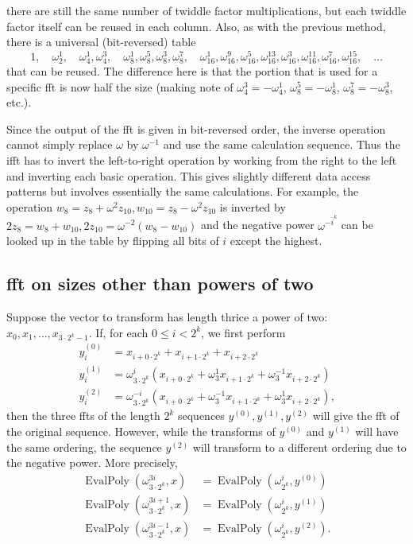 \documentclass[12 pt]{amsart}
\newcommand{\om}[2] {\omega_{#1}^{#2}}
\begin{document}
there are still the same number of twiddle factor multiplications, but each twiddle factor
itself can be reused in each column. Also, as with the previous method, there is a
universal (bit-reversed) table
\begin{equation}
\label{fft_fma_tab}
1,
\quad \om{2}{1},
\quad \om{4}{1}, \om{4}{3},
\quad \om{8}{1},\om{8}{5},\om{8}{3},\om{8}{7},
\quad \om{16}{1},\om{16}{9},\om{16}{5},\om{16}{13},\om{16}{3},\om{16}{11},\om{16}{7},\om{16}{15},
\quad \dots
\end{equation}
that can be reused. The difference here is that the portion that is used for a
specific fft is now half the size (making note of $\om{4}{3} = -\om{4}{1}$,
$\om{8}{5} = -\om{8}{1}$, $\om{8}{7} = -\om{8}{3}$, etc.).

Since the output of the fft is given in bit-reversed order, the inverse
operation cannot simply replace $\omega$ by $\omega^{-1}$ and use the same
calculation sequence. Thus the ifft has to invert the left-to-right operation
by working from the right to the left and inverting each basic operation. This
gives slightly different data access patterns but involves essentially the same
calculations. For example, the operation $w_8 = z_8 + \omega^2 z_{10}\text{,}
\, w_{10} = z_8 - \omega^2 z_{10}$ is inverted by $2 z_8 = w_8 + w_{10}\text{,}
\, 2 z_{10} = \omega^{-2}(w_8 - w_{10})$ and the negative power
$\omega^{-\overline{i}^k}$ can be looked up in the table by flipping all bits
of $i$ except the highest.

\subsection{fft on sizes other than powers of two}
\label{section_odd}

Suppose the vector to transform has length thrice a power of two: 
$x_0,x_1,\dots,x_{3\cdot2^k-1}$. If, for each $0 \le i < 2^k$, we first perform
\begin{align*}
y_{i}^{(0)} &= x_{i+0\cdot 2^k} + x_{i+1\cdot 2^k} + x_{i+2\cdot 2^k}\\
y_{i}^{(1)} &= \om{3\cdot 2^k}{i}(x_{i+0\cdot 2^k} + \om{3}{1}x_{i+1\cdot 
2^k} + \om{3}{-1}x_{i+2\cdot 2^k})\\
y_{i}^{(2)} &= \om{3\cdot 2^k}{-i}(x_{i+0\cdot 2^k} + 
\om{3}{-1}x_{i+1\cdot 
2^k} + \om{3}{1}x_{i+2\cdot 2^k})\text{,}
\end{align*}
then the three ffts of the length $2^k$ sequences $y^{(0)}, y^{(1)}, y^{(2)}$ 
will give the fft of the original sequence. However, while the transforms
of $y^{(0)}$ and $y^{(1)}$ will have the same ordering, the sequence $y^{(2)}$
will transform to a different ordering due to the negative power.
More precisely,
\begin{align*}
\operatorname{EvalPoly}(\om{3\cdot2^k}{3i}, x) &= 
\operatorname{EvalPoly}(\om{2^k}{i}, y^{(0)})\\
\operatorname{EvalPoly}(\om{3\cdot2^k}{3i+1}, x) &= 
\operatorname{EvalPoly}(\om{2^k}{i}, y^{(1)})\\
\operatorname{EvalPoly}(\om{3\cdot2^k}{3i-1}, x) &= 
\operatorname{EvalPoly}(\om{2^k}{i}, y^{(2)})\text{.}
\end{align*}
\end{document}
